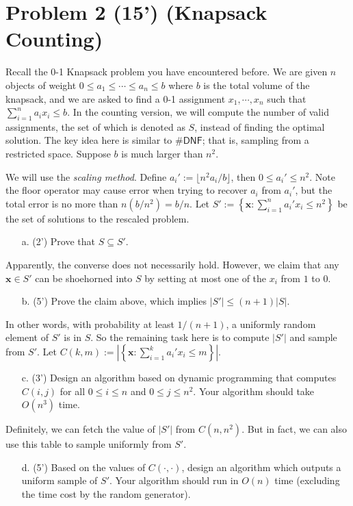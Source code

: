 \section*{Problem 2 (15') (Knapsack Counting)} Recall the 0-1 Knapsack problem you have encountered before. We are given $n$ objects of weight $0\leq a_1\leq\cdots\leq a_n\leq b$ where $b$ is the total volume of the knapsack, and we are asked to find a 0-1 assignment $x_1,\cdots,x_n$ such that $\sum_{i=1}^{n}a_ix_i\leq b$. In the counting version, we will compute the number of valid assignments, the set of which is denoted as $S$, 
 instead of finding the optimal solution. The key idea here is similar to $\mathsf{\#DNF}$; that is, sampling from a restricted space. Suppose $b$ is much larger than $n^2$. 
    
    We will use the \textit{scaling method}. Define $a_i':=\lfloor n^2a_i/b\rfloor$, then $0\leq a_i'\leq n^2$. Note the floor operator may cause error when trying to recover $a_i$ from $a_i'$, but the total error is no more than $n(b/n^2)=b/n$. Let $S':=\left\{\bm x: \sum_{i=1}^{n}a_i'x_i\leq n^2\right\}$ be the set of solutions to the rescaled problem. 
    \begin{itemize}
        \item [a. (2')] Prove that $S\subseteq S'$. 
    \end{itemize}
    Apparently, the converse does not necessarily hold. However, we claim that any $\bm x\in S'$ can be shoehorned into $S$ by setting at most one of the $x_i$ from $1$ to $0$. 
    \begin{itemize}
        \item [b. (5')] Prove the claim above, which implies $|S'|\leq (n+1)|S|$. 
    \end{itemize}
    In other words, with probability at least $1/(n+1)$, a uniformly random element of $S'$ is in $S$. So the remaining task here is to compute $|S'|$ and sample from $S'$. Let $C(k,m):=\left|\left\{\bm x: \sum_{i=1}^{k}a_i'x_i\leq m\right\}\right|$. 
    \begin{itemize}
        \item [c. (3')] Design an algorithm based on dynamic programming that computes $C(i,j)$ for all $0\leq i\leq n$ and $0\leq j\leq n^2$. Your algorithm should take $O(n^3)$ time. 
    \end{itemize}
    Definitely, we can fetch the value of $|S'|$ from $C(n,n^2)$. But in fact, we can also use this table to sample uniformly from $S'$. 
    \begin{itemize}
        \item [d. (5')] Based on the values of $C(\cdot,\cdot)$, design an algorithm which outputs a uniform sample of $S'$. Your algorithm should run in $O(n)$ time (excluding the time cost by the random generator).
    \end{itemize}